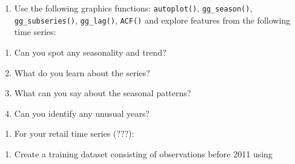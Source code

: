 \documentclass[]{book}
\newenvironment{Shaded}{\begin{snugshade}}{\end{snugshade}}
\newcommand{\KeywordTok}[1]{\textcolor[rgb]{0.13,0.29,0.53}{\textbf{#1}}}
\newcommand{\DataTypeTok}[1]{\textcolor[rgb]{0.13,0.29,0.53}{#1}}
\newcommand{\StringTok}[1]{\textcolor[rgb]{0.31,0.60,0.02}{#1}}
\newcommand{\OperatorTok}[1]{\textcolor[rgb]{0.81,0.36,0.00}{\textbf{#1}}}
\newcommand{\NormalTok}[1]{#1}
\providecommand{\tightlist}{%
  \setlength{\itemsep}{0pt}\setlength{\parskip}{0pt}}
\begin{document}
\begin{Shaded}
\end{Shaded}

\begin{enumerate}
\def\labelenumi{\arabic{enumi}.}
\setcounter{enumi}{1}
\tightlist
\item
  Use the following graphics functions: \texttt{autoplot()},
  \texttt{gg\_season()}, \texttt{gg\_subseries()}, \texttt{gg\_lag()},
  \texttt{ACF()} and explore features from the following time series:
\end{enumerate}

\begin{enumerate}
\def\labelenumi{\alph{enumi}.}
\tightlist
\item
  Can you spot any seasonality and trend?
\item
  What do you learn about the series?
\item
  What can you say about the seasonal patterns?
\item
  Can you identify any unusual years?
\end{enumerate}

\begin{enumerate}
\def\labelenumi{\arabic{enumi}.}
\setcounter{enumi}{2}
\tightlist
\item
  For your retail time series (???):
\end{enumerate}

\begin{enumerate}
\def\labelenumi{\alph{enumi}.}
\tightlist
\item
  Create a training dataset consisting of observations before 2011 using
\end{enumerate}

\begin{Shaded}
\end{Shaded}
\end{document}
